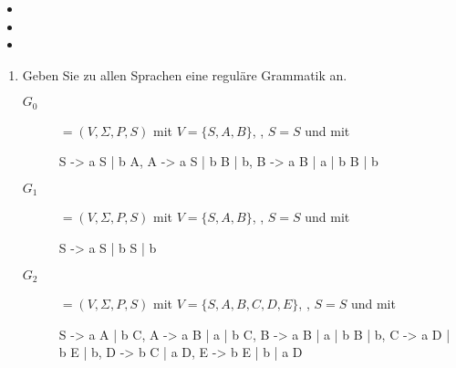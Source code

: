 \documentclass{bschlangaul-aufgabe}
\begin{document}
\begin{itemize}
\item {}
\item {}
\item {}
\end{itemize}
\begin{enumerate}


\item Geben Sie zu allen Sprachen eine reguläre Grammatik an.

\begin{bAntwort}

\begin{description}
%

\item[$G_0$]

$= (V, \Sigma, P, S)$ mit
$V = \{S, A, B\}$,
,
$S = S$ und mit

\begin{bProduktionsRegeln}
S -> a S | b A,
A -> a S | b B | b,
B -> a B | a | b B | b
\end{bProduktionsRegeln}

%

\item[$G_1$]

$= (V, \Sigma, P, S)$ mit
$V = \{S, A, B\}$,
,
$S = S$ und mit

\begin{bProduktionsRegeln}
S -> a S | b S | b
\end{bProduktionsRegeln}

%

\item[$G_2$]

$= (V, \Sigma, P, S)$ mit
$V = \{S, A, B, C, D, E\}$,
, $S = S$ und mit

\begin{bProduktionsRegeln}
S -> a A | b C,
A -> a B | a | b C,
B -> a B | a | b B | b,
C -> a D | b E | b,
D -> b C | a D,
E -> b E | b | a D
\end{bProduktionsRegeln}

\end{description}
\end{bAntwort}


\end{enumerate}
\end{document}
